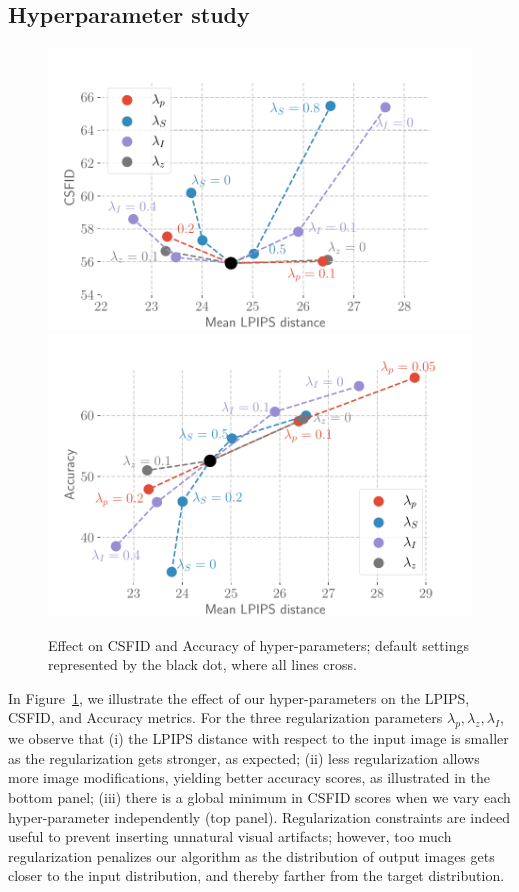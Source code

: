 \subsection{Hyperparameter study}\label{hparam}

\begin{figure}[H]
    \centering
    \includegraphics[width=0.8\linewidth]{images/flexit/assets/hparam_fig.pdf}
    \includegraphics[width=0.8\linewidth]{images/flexit/assets/hparam_acc.pdf}
    \caption{Effect  on \ac{CSFID} and Accuracy of hyper-parameters;  default settings  represented by 
    the black dot, where all lines cross.}
\label{fig:hparam_csfid}
\end{figure}


In Figure~\ref{fig:hparam_csfid}, we illustrate the effect of our hyper-parameters on
 the \ac{LPIPS}, \ac{CSFID}, and Accuracy metrics. 
For the three regularization parameters $\lambda_p, \lambda_z, \lambda_I$, we observe
 that
(i) the \ac{LPIPS} distance with respect to the input image is smaller as the regularization 
gets stronger, as expected; 
(ii) less regularization allows more image modifications, yielding better accuracy
 scores, as illustrated in the bottom panel; 
(iii) there is a global minimum in \ac{CSFID} scores when we vary each hyper-parameter 
 independently (top panel). Regularization constraints are indeed useful to prevent
  inserting unnatural visual artifacts; however, too much regularization penalizes our 
  algorithm as the distribution of output images gets closer to the input distribution, 
  and thereby farther from the  target distribution.


